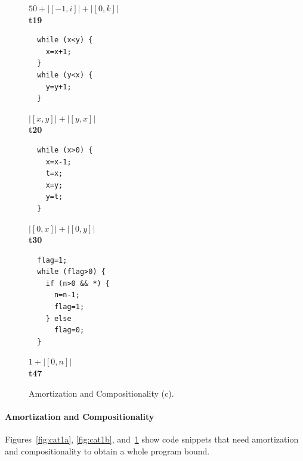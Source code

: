 \documentclass[nocopyrightspace,preprint,pldi]{sigplanconf-pldi15}
\begin{document}
{\begin{figure}
\begin{minipage}[b]{\progwidth}
\begin{center}
$50 + |[-1,i]| + |[0,k]|$
\\[.7\baselineskip]
      {\bf t19}
    \end{center}
  \end{minipage}%
%
%
%
  \begin{minipage}[b]{\progwidth}
    \begin{center}
   \begin{lstlisting}
  while (x<y) {
    x=x+1;
  }
  while (y<x) {
    y=y+1;
  }
   \end{lstlisting}

$|[x,y]|+|[y,x]|$
\\[.7\baselineskip]
      {\bf t20}
    \end{center}
  \end{minipage}%
%
%
  \begin{minipage}[b]{\progwidth}
    \begin{center}
   \begin{lstlisting}
  while (x>0) {
    x=x-1;
    t=x;
    x=y;
    y=t;
  }
   \end{lstlisting}

$|[0,x]|+|[0,y]|$
\\[.7\baselineskip]
      {\bf t30}
    \end{center}
  \end{minipage}
%
%
  \begin{minipage}[b]{\progwidth}
    \begin{center}
   \begin{lstlisting}
  flag=1;
  while (flag>0) {
    if (n>0 && *) {
      n=n-1;
      flag=1;
    } else
      flag=0;
  }
   \end{lstlisting}

$1 + |[0, n]|$
\\[.7\baselineskip]
      {\bf t47}
    \end{center}
  \end{minipage}

   \caption{Amortization and Compositionality (c).}
  \label{fig:cat1c}
\end{figure}

\paragraph{Amortization and Compositionality}

Figures~\ref{fig:cat1a}, \ref{fig:cat1b}, and~\ref{fig:cat1c} show
code snippets that need amortization and compositionality to obtain a
whole program bound.

}
\end{document}

